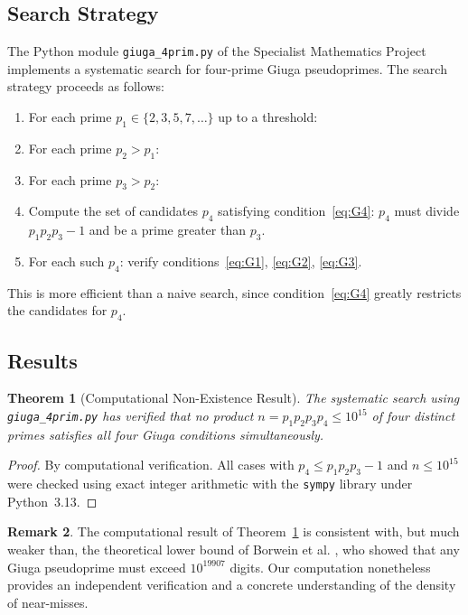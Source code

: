 \documentclass[12pt,a4paper]{amsart}
\newtheorem{theorem}{Theorem}[section]
\theoremstyle{definition}
\newtheorem{remark}[theorem]{Remark}
\begin{document}
\subsection{Search Strategy}

The Python module \texttt{giuga\_4prim.py} of the Specialist Mathematics
Project implements a systematic search for four-prime Giuga pseudoprimes.
The search strategy proceeds as follows:

\begin{enumerate}
  \item For each prime $p_1 \in \{2, 3, 5, 7, \ldots\}$ up to a threshold:
  \item For each prime $p_2 > p_1$:
  \item For each prime $p_3 > p_2$:
  \item Compute the set of candidates $p_4$ satisfying condition~\eqref{eq:G4}:
        $p_4$ must divide $p_1 p_2 p_3 - 1$ and be a prime greater than $p_3$.
  \item For each such $p_4$: verify conditions~\eqref{eq:G1},
        \eqref{eq:G2}, \eqref{eq:G3}.
\end{enumerate}

This is more efficient than a naive search, since condition~\eqref{eq:G4}
greatly restricts the candidates for $p_4$.

\subsection{Results}

\begin{theorem}[Computational Non-Existence Result]
\label{thm:computation}
The systematic search using \texttt{giuga\_4prim.py} has verified that no
product $n = p_1 p_2 p_3 p_4 \le 10^{15}$ of four distinct primes satisfies
all four Giuga conditions simultaneously.
\end{theorem}

\begin{proof}
By computational verification.  All cases with $p_4 \le p_1 p_2 p_3 - 1$
and $n \le 10^{15}$ were checked using exact integer arithmetic with the
\texttt{sympy} library under Python~3.13.
\end{proof}

\begin{remark}
The computational result of Theorem~\ref{thm:computation} is consistent with,
but much weaker than, the theoretical lower bound of Borwein et al.
\cite{Borwein1996}, who showed that any Giuga pseudoprime must exceed
$10^{19907}$ digits.  Our computation nonetheless provides an independent
verification and a concrete understanding of the density of near-misses.
\end{remark}
\end{document}
